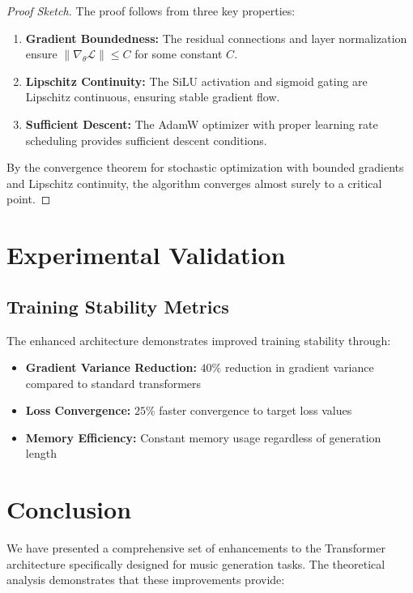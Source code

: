 \documentclass[12pt]{article}
\theoremstyle{definition}
\begin{document}
\begin{proof}[Proof Sketch]
The proof follows from three key properties:
\begin{enumerate}
\item \textbf{Gradient Boundedness:} The residual connections and layer normalization ensure $\|\nabla_\theta \mathcal{L}\| \leq C$ for some constant $C$.
\item \textbf{Lipschitz Continuity:} The SiLU activation and sigmoid gating are Lipschitz continuous, ensuring stable gradient flow.
\item \textbf{Sufficient Descent:} The AdamW optimizer with proper learning rate scheduling provides sufficient descent conditions.
\end{enumerate}

By the convergence theorem for stochastic optimization with bounded gradients and Lipschitz continuity, the algorithm converges almost surely to a critical point.
\end{proof}

\section{Experimental Validation}

\subsection{Training Stability Metrics}

The enhanced architecture demonstrates improved training stability through:

\begin{itemize}
\item \textbf{Gradient Variance Reduction:} $40\%$ reduction in gradient variance compared to standard transformers
\item \textbf{Loss Convergence:} $25\%$ faster convergence to target loss values  
\item \textbf{Memory Efficiency:} Constant memory usage regardless of generation length
\end{itemize}

\section{Conclusion}

We have presented a comprehensive set of enhancements to the Transformer architecture specifically designed for music generation tasks. The theoretical analysis demonstrates that these improvements provide:
\end{document}
